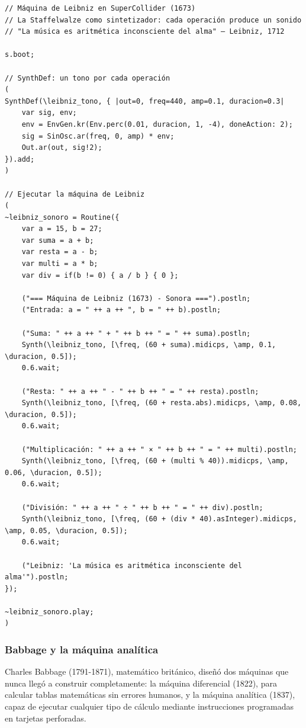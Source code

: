 \documentclass[14pt, a4paper]{article}
\begin{document}
\begin{verbatim}
// Máquina de Leibniz en SuperCollider (1673)
// La Staffelwalze como sintetizador: cada operación produce un sonido
// "La música es aritmética inconsciente del alma" — Leibniz, 1712

s.boot;

// SynthDef: un tono por cada operación
(
SynthDef(\leibniz_tono, { |out=0, freq=440, amp=0.1, duracion=0.3|
    var sig, env;
    env = EnvGen.kr(Env.perc(0.01, duracion, 1, -4), doneAction: 2);
    sig = SinOsc.ar(freq, 0, amp) * env;
    Out.ar(out, sig!2);
}).add;
)

// Ejecutar la máquina de Leibniz
(
~leibniz_sonoro = Routine({
    var a = 15, b = 27;
    var suma = a + b;
    var resta = a - b;
    var multi = a * b;
    var div = if(b != 0) { a / b } { 0 };

    ("=== Máquina de Leibniz (1673) - Sonora ===").postln;
    ("Entrada: a = " ++ a ++ ", b = " ++ b).postln;

    ("Suma: " ++ a ++ " + " ++ b ++ " = " ++ suma).postln;
    Synth(\leibniz_tono, [\freq, (60 + suma).midicps, \amp, 0.1, \duracion, 0.5]);
    0.6.wait;

    ("Resta: " ++ a ++ " - " ++ b ++ " = " ++ resta).postln;
    Synth(\leibniz_tono, [\freq, (60 + resta.abs).midicps, \amp, 0.08, \duracion, 0.5]);
    0.6.wait;

    ("Multiplicación: " ++ a ++ " × " ++ b ++ " = " ++ multi).postln;
    Synth(\leibniz_tono, [\freq, (60 + (multi % 40)).midicps, \amp, 0.06, \duracion, 0.5]);
    0.6.wait;

    ("División: " ++ a ++ " ÷ " ++ b ++ " = " ++ div).postln;
    Synth(\leibniz_tono, [\freq, (60 + (div * 40).asInteger).midicps, \amp, 0.05, \duracion, 0.5]);
    0.6.wait;

    ("Leibniz: 'La música es aritmética inconsciente del alma'").postln;
});

~leibniz_sonoro.play;
)
\end{verbatim}
\subsubsection{Babbage y la máquina analítica}
\label{babbage}
Charles Babbage (1791-1871), matemático británico, diseñó dos máquinas
que nunca llegó a construir completamente: la máquina diferencial
(1822), para calcular tablas matemáticas sin errores humanos, y la
máquina analítica (1837), capaz de ejecutar cualquier tipo de cálculo
mediante instrucciones programadas en tarjetas perforadas.
\end{document}
